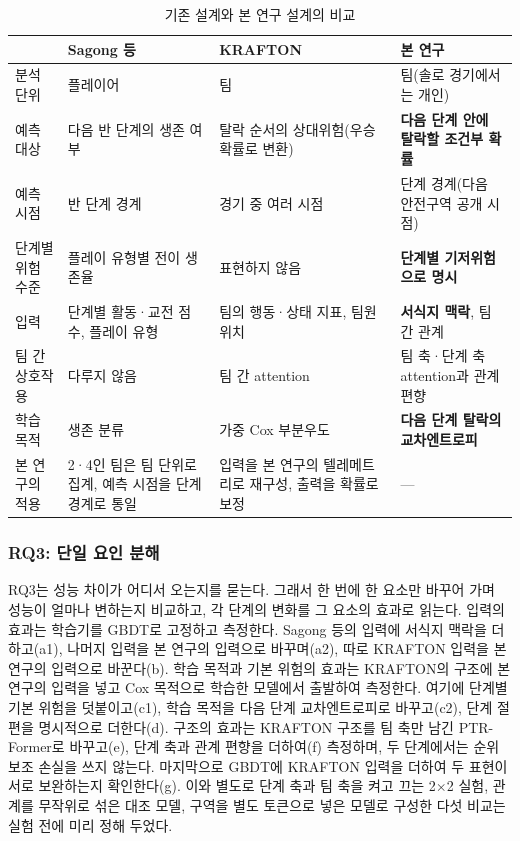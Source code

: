 \begin{table}[t]
\centering
\caption{기존 설계와 본 연구 설계의 비교}
\label{tab:compare}
\footnotesize
\renewcommand{\arraystretch}{1.2}
\begin{tabular}{p{2.3cm}p{4.3cm}p{4.6cm}p{4.6cm}}
\hline
 & Sagong 등~\cite{Sagong25a} & KRAFTON~\cite{KRAFTON} & 본 연구 \\
\hline
분석 단위 & 플레이어 & 팀 & 팀(솔로 경기에서는 개인) \\
예측 대상 & 다음 반 단계의 생존 여부 & 탈락 순서의 상대위험(우승확률로 변환) & \textbf{다음 단계 안에 탈락할 조건부 확률} \\
예측 시점 & 반 단계 경계 & 경기 중 여러 시점 & 단계 경계(다음 안전구역 공개 시점) \\
단계별 위험 수준 & 플레이 유형별 전이 생존율 & 표현하지 않음 & \textbf{단계별 기저위험으로 명시} \\
입력 & 단계별 활동·교전 점수, 플레이 유형 & 팀의 행동·상태 지표, 팀원 위치 & \textbf{서식지 맥락}, 팀 간 관계 \\
팀 간 상호작용 & 다루지 않음 & 팀 간 attention & 팀 축·단계 축 attention과 관계 편향 \\
학습 목적 & 생존 분류 & 가중 Cox 부분우도 & \textbf{다음 단계 탈락의 교차엔트로피} \\
\hline
본 연구의 적용 & 2·4인 팀은 팀 단위로 집계, 예측 시점을 단계 경계로 통일 & 입력을 본 연구의 텔레메트리로 재구성, 출력을 확률로 보정 & --- \\
\hline
\end{tabular}
\end{table}

\subsubsection{RQ3: 단일 요인 분해}
\label{sec:method:decomposition}
RQ3는 성능 차이가 어디서 오는지를 묻는다. 그래서 한 번에 한 요소만 바꾸어 가며 성능이 얼마나 변하는지 비교하고, 각 단계의 변화를 그 요소의 효과로 읽는다.
입력의 효과는 학습기를 GBDT로 고정하고 측정한다. Sagong 등의 입력에 서식지 맥락을 더하고(a1), 나머지 입력을 본 연구의 입력으로 바꾸며(a2), 따로 KRAFTON 입력을 본 연구의 입력으로 바꾼다(b).
학습 목적과 기본 위험의 효과는 KRAFTON의 구조에 본 연구의 입력을 넣고 Cox 목적으로 학습한 모델에서 출발하여 측정한다. 여기에 단계별 기본 위험을 덧붙이고(c1), 학습 목적을 다음 단계 교차엔트로피로 바꾸고(c2), 단계 절편을 명시적으로 더한다(d).
구조의 효과는 KRAFTON 구조를 팀 축만 남긴 PTR-Former로 바꾸고(e), 단계 축과 관계 편향을 더하여(f) 측정하며, 두 단계에서는 순위 보조 손실을 쓰지 않는다.
마지막으로 GBDT에 KRAFTON 입력을 더하여 두 표현이 서로 보완하는지 확인한다(g).
이와 별도로 단계 축과 팀 축을 켜고 끄는 2$\times$2 실험, 관계를 무작위로 섞은 대조 모델, 구역을 별도 토큰으로 넣은 모델로 구성한 다섯 비교는 실험 전에 미리 정해 두었다.

